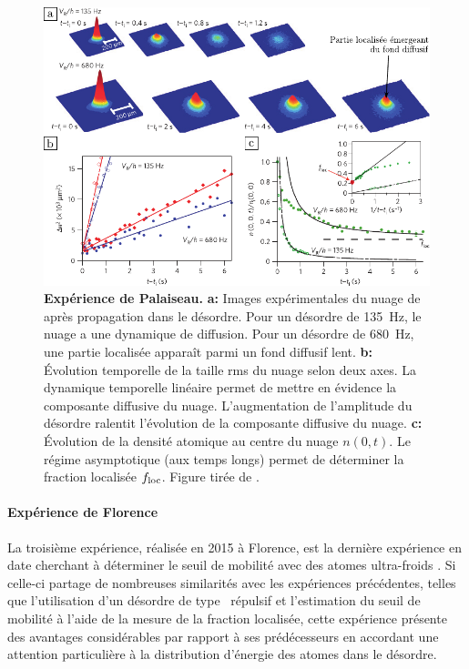 \begin{figure}
\centering
\includegraphics[width=\textwidth]{Fig/Localisation/experience_palaiseau.pdf}
\caption{\textbf{Expérience de Palaiseau.} \textbf{a:} Images expérimentales du nuage de  après propagation dans le désordre. Pour un désordre de \SI{135}{\hertz}, le nuage a une dynamique de diffusion. Pour un désordre de \SI{680}{\hertz}, une partie localisée apparaît parmi un fond diffusif lent. \textbf{b:} Évolution temporelle de la taille rms du nuage selon deux axes. La dynamique temporelle linéaire permet de mettre en évidence la composante diffusive du nuage. L'augmentation de l'amplitude du désordre ralentit l'évolution de la composante diffusive du nuage. \textbf{c:} Évolution de la densité atomique au centre du nuage $n(0,t)$. Le régime asymptotique (aux temps longs) permet de déterminer la fraction localisée $f_{\mathrm{loc}}$. Figure tirée de \citep{jendrzejewski2012three}.}
\label{fig:experience_palaiseau}
\end{figure}


\paragraph*{Expérience de Florence}
La troisième expérience, réalisée en 2015 à Florence, est la dernière expérience en date cherchant à déterminer le seuil de mobilité avec des atomes ultra-froids \citep{semeghini2015measurement}. Si celle-ci partage de nombreuses similarités avec les expériences précédentes, telles que l'utilisation d'un désordre de type \speckle\ répulsif et l'estimation du seuil de mobilité à l'aide de la mesure de la fraction localisée, cette expérience présente des avantages considérables par rapport à ses prédécesseurs en accordant une attention particulière à la distribution d'énergie des atomes dans le désordre. 

